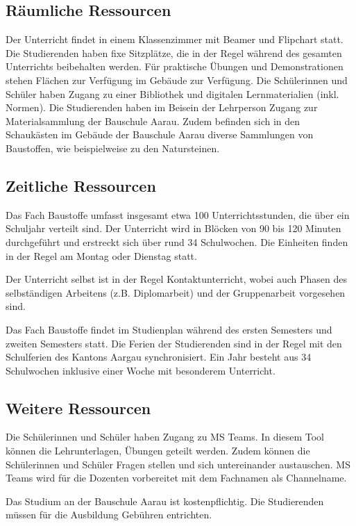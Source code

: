 \documentclass[
11pt,
captions=tableheading,
smallheadings,
headsepline,
footsepline, 
captions=tableheading,
parskip=half-,
]{scrartcl}
\begin{document}
\subsection{Räumliche Ressourcen}
Der Unterricht findet in einem Klassenzimmer mit Beamer und Flipchart statt.
Die Studierenden haben fixe Sitzplätze, die in der Regel während des gesamten Unterrichts beibehalten werden.
Für praktische Übungen und Demonstrationen stehen Flächen zur Verfügung im Gebäude zur Verfügung. Die Schülerinnen und Schüler haben Zugang zu einer Bibliothek und digitalen Lernmaterialien (inkl. Normen).
Die Studierenden haben im Beisein der Lehrperson Zugang zur Materialsammlung der Bauschule Aarau.
Zudem befinden sich in den Schaukästen im Gebäude der Bauschule Aarau diverse Sammlungen von Baustoffen, wie beispielweise zu den Natursteinen.

\subsection{Zeitliche Ressourcen}
Das Fach Baustoffe umfasst insgesamt etwa 100 Unterrichtsstunden, die über ein Schuljahr verteilt sind. Der Unterricht wird in Blöcken von 90 bis 120 Minuten durchgeführt und erstreckt sich über rund 34 Schulwochen.
Die Einheiten finden in der Regel am Montag oder Dienstag statt.

Der Unterricht selbst ist in der Regel Kontaktunterricht, wobei auch Phasen des selbständigen Arbeitens (z.B. Diplomarbeit) und der Gruppenarbeit vorgesehen sind.

Das Fach Baustoffe findet im Studienplan während des ersten Semesters  und zweiten Semesters statt.
Die Ferien der Studierenden sind in der Regel mit den Schulferien des Kantons Aargau synchronisiert. Ein Jahr besteht aus 34 Schulwochen inklusive einer Woche mit besonderem Unterricht.

\subsection{Weitere Ressourcen}
Die Schülerinnen und Schüler haben Zugang zu MS Teams. In diesem Tool können die Lehrunterlagen, Übungen geteilt werden. Zudem können die Schülerinnen und Schüler Fragen stellen und sich untereinander austauschen. MS Teams wird für die Dozenten vorbereitet mit dem Fachnamen als Channelname.

Das Studium an der Bauschule Aarau ist kostenpflichtig. Die Studierenden müssen für die Ausbildung Gebühren entrichten.
\end{document}
